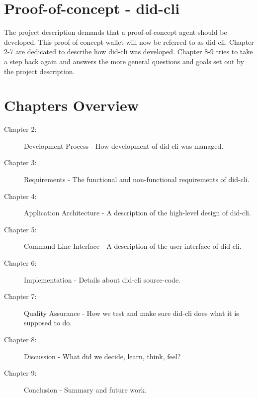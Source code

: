 \newpage

\section{Proof-of-concept - \acrshort{did-cli}}

The project description demands that a proof-of-concept agent should be developed. This proof-of-concept wallet will now be referred to as \acrfull{did-cli}. Chapter 2-7 are dedicated to describe how \acrshort{did-cli} was developed. Chapter 8-9 tries to take a step back again and answers the more general questions and goals set out by the project description.

\section{Chapters Overview}

\begin{description}
    \item[Chapter 2:] Development Process - How development of \acrshort{did-cli} was managed.
    \item[Chapter 3:] Requirements - The functional and non-functional requirements of \acrshort{did-cli}.
    \item[Chapter 4:] Application Architecture - A description of the high-level design of \acrshort{did-cli}.
    \item[Chapter 5:] Command-Line Interface - A description of the user-interface of \acrshort{did-cli}.
    \item[Chapter 6:] Implementation - Details about \acrshort{did-cli} source-code.
    \item[Chapter 7:] Quality Assurance - How we test and make sure \acrshort{did-cli} does what it is supposed to do. 
    \item[Chapter 8:] Discussion - What did we decide, learn, think, feel?
    \item[Chapter 9:] Conclusion - Summary and future work.
\end{description}
